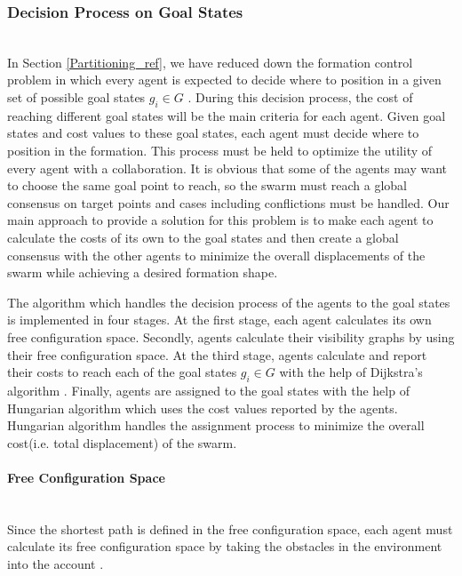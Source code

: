 \subsubsection{Decision Process on Goal States}\hspace{0pt} \label{DecisionProcess Ref} \\
In Section \ref{Partitioning_ref}, we have reduced down the formation control problem in which every agent is expected to decide where to position in a given set of possible goal states $g_i \in G$ .  During this decision process, the cost of reaching different goal states will be the main criteria for each agent. Given goal states and cost values to these goal states, each agent must decide where to position in the formation. This process must be held to optimize the utility of every agent with a collaboration. It is obvious that some of the agents may want to choose the same goal point to reach, so the swarm must reach a global consensus on target points and cases including conflictions must be handled. Our main approach to provide a solution for this problem is to make each agent to calculate the costs of its own to the goal states and then create a global consensus with the other agents to minimize the overall displacements of the swarm while achieving a desired formation shape. 

The algorithm which handles the decision process of the agents to the goal states is implemented in four stages. At the first stage, each agent calculates its own free configuration space. Secondly, agents calculate their visibility graphs by using their free configuration space. At the third stage,  agents calculate and report their costs to reach each of the goal states $g_i \in G$ with the help of Dijkstra's algorithm .  Finally, agents are assigned to the goal states with the help of Hungarian algorithm which uses the cost values reported by the agents. Hungarian algorithm handles the assignment process to minimize the overall cost(i.e. total displacement) of the swarm.
	
\paragraph{Free Configuration Space}\hspace{0pt} \\
Since the shortest path is defined in the free configuration space, each agent must calculate its free configuration space by taking the obstacles in the environment into the account \cite{92}. 

